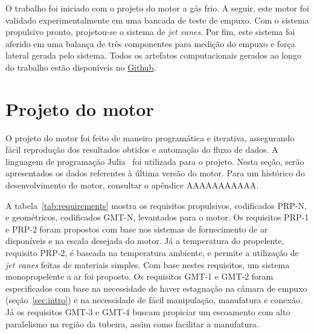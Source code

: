 
O trabalho foi iniciado com o projeto do motor a gás frio. A seguir, este motor foi validado experimentalmente em uma bancada de teste de empuxo. Com o sistema propulsivo pronto, projetou-se o sistema de \textit{jet vanes}. Por fim, este sistema foi aferido em uma balança de três componentes para medição do empuxo e força lateral gerada pelo sistema. Todos os artefatos computacionais gerados ao longo do trabalho estão disponíveis no \href{https://github.com/pekpuglia/IC-Thrust-Vector-Control}{Github}.

\section{Projeto do motor}\label{sec:motor_project}

O projeto do motor foi feito de maneira programática e iterativa, assegurando fácil reprodução dos resultados obtidos e automação do fluxo de dados. A linguagem de programação Julia~\cite{Julia-2017} foi utilizada para o projeto. Nesta seção, serão apresentados os dados referentes à última versão do motor. Para um histórico do desenvolvimento do motor, consultar o apêndice AAAAAAAAAAA\@.  

A tabela~\ref{tab:requirements} mostra os requisitos propulsivos, codificados PRP-N, e geométricos, codificados GMT-N, levantados para o motor. Os requisitos PRP-1 e PRP-2 foram propostos com base nos sistemas de fornecimento de ar disponíveis e na escala desejada do motor. Já a temperatura do propelente, requisito PRP-2, é baseada na temperatura ambiente, e permite a utilização de \textit{jet vanes} feitas de materiais simples. Com base nestes requisitos, um sistema monopropelente a ar foi proposto. Os requisitos GMT-1 e GMT-2 foram especificados com base na necessidade de haver estagnação na câmara de empuxo (seção~\ref{sec:intro}) e na necessidade de fácil manipulação, manufatura e conexão. Já os requisitos GMT-3 e GMT-4 buscam propiciar um escoamento com alto paralelismo na região da tubeira, assim como facilitar a manufatura.

